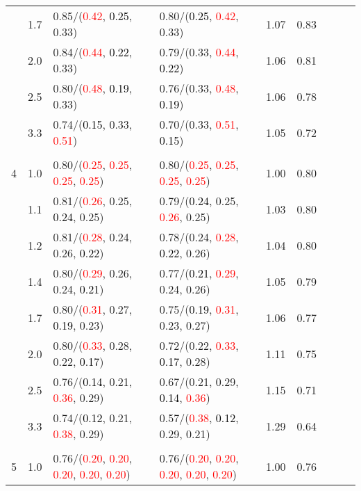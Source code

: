 \documentclass[10pt,a4paper]{report}
\begin{document}
\begin{table}[!htbp]
\begin{center}
{\begin{tabular}{ccllccccc}
			&1.7&0.85/(\textcolor{red}{0.42}, \textcolor{black}{0.25}, 0.33)&0.80/(\textcolor{black}{0.25}, \textcolor{red}{0.42}, 0.33)&1.07&0.83\\
			&2.0&0.84/(\textcolor{red}{0.44}, \textcolor{black}{0.22}, 0.33)&0.79/(0.33, \textcolor{red}{0.44}, \textcolor{black}{0.22})&1.06&0.81\\
			&2.5&0.80/(\textcolor{red}{0.48}, \textcolor{black}{0.19}, 0.33)&0.76/(0.33, \textcolor{red}{0.48}, \textcolor{black}{0.19})&1.06&0.78\\
			&3.3&0.74/(\textcolor{black}{0.15}, 0.33, \textcolor{red}{0.51})&0.70/(0.33, \textcolor{red}{0.51}, \textcolor{black}{0.15})&1.05&0.72\\
			&&&&\\
			4			&1.0&0.80/(\textcolor{red}{0.25}, \textcolor{red}{0.25}, \textcolor{red}{0.25}, \textcolor{red}{0.25})&0.80/(\textcolor{red}{0.25}, \textcolor{red}{0.25}, \textcolor{red}{0.25}, \textcolor{red}{0.25})&1.00&0.80\\
			&1.1&0.81/(\textcolor{red}{0.26}, 0.25, \textcolor{black}{0.24}, 0.25)&0.79/(\textcolor{black}{0.24}, 0.25, \textcolor{red}{0.26}, 0.25)&1.03&0.80\\
			&1.2&0.81/(\textcolor{red}{0.28}, 0.24, 0.26, \textcolor{black}{0.22})&0.78/(0.24, \textcolor{red}{0.28}, \textcolor{black}{0.22}, 0.26)&1.04&0.80\\
			&1.4&0.80/(\textcolor{red}{0.29}, 0.26, 0.24, \textcolor{black}{0.21})&0.77/(\textcolor{black}{0.21}, \textcolor{red}{0.29}, 0.24, 0.26)&1.05&0.79\\
			&1.7&0.80/(\textcolor{red}{0.31}, 0.27, \textcolor{black}{0.19}, 0.23)&0.75/(\textcolor{black}{0.19}, \textcolor{red}{0.31}, 0.23, 0.27)&1.06&0.77\\
			&2.0&0.80/(\textcolor{red}{0.33}, 0.28, 0.22, \textcolor{black}{0.17})&0.72/(0.22, \textcolor{red}{0.33}, \textcolor{black}{0.17}, 0.28)&1.11&0.75\\
			&2.5&0.76/(\textcolor{black}{0.14}, 0.21, \textcolor{red}{0.36}, 0.29)&0.67/(0.21, 0.29, \textcolor{black}{0.14}, \textcolor{red}{0.36})&1.15&0.71\\
			&3.3&0.74/(\textcolor{black}{0.12}, 0.21, \textcolor{red}{0.38}, 0.29)&0.57/(\textcolor{red}{0.38}, \textcolor{black}{0.12}, 0.29, 0.21)&1.29&0.64\\
			&&&&\\
			5			&1.0&0.76/(\textcolor{red}{0.20}, \textcolor{red}{0.20}, \textcolor{red}{0.20}, \textcolor{red}{0.20}, \textcolor{red}{0.20})&0.76/(\textcolor{red}{0.20}, \textcolor{red}{0.20}, \textcolor{red}{0.20}, \textcolor{red}{0.20}, \textcolor{red}{0.20})&1.00&0.76\\

\end{tabular}}
\end{center}
\end{table}
\end{document}
